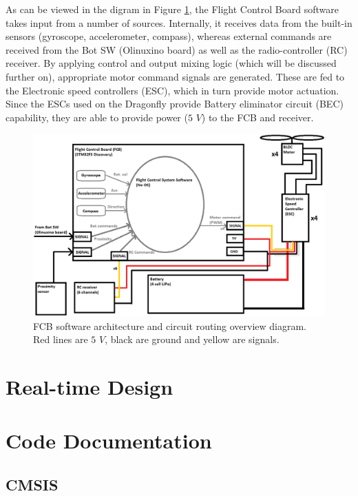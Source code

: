 \documentclass[a4paper]{report}
\begin{document}
As can be viewed in the digram in Figure \ref{fig:fcb-sw-hw-arch}, the Flight Control Board software takes input from a number of sources. Internally, it receives data from the built-in sensors (gyroscope, accelerometer, compass), whereas external commands are received from the Bot SW (Olinuxino board) as well as the radio-controller (RC) receiver. By applying control and output mixing logic (which will be discussed further on), appropriate motor command signals are generated. These are fed to the Electronic speed controllers (ESC), which in turn provide motor actuation. Since the ESCs used on the Dragonfly provide Battery eliminator circuit (BEC) capability, they are able to provide power ($5$ $V$) to the FCB and receiver.

\begin{figure}[h]
    \centering
    \includegraphics[scale=0.42]{images/fcb-sw-hw-design.png}
    \caption{FCB software architecture and circuit routing overview diagram. Red lines are $5$ $V$, black are ground and yellow are signals.}
    \label{fig:fcb-sw-hw-arch}
\end{figure}

	\section{Real-time Design}

	\section{Code Documentation}
		
		\subsection{CMSIS}
\end{document}
